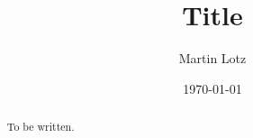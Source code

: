 \documentclass[11pt,a4paper]{amsart}
\title{Title}
\author{Martin Lotz}
\date{\today}
\begin{document}
\maketitle

\begin{abstract}
To be written.
\end{abstract}


\tableofcontents








\end{document}

